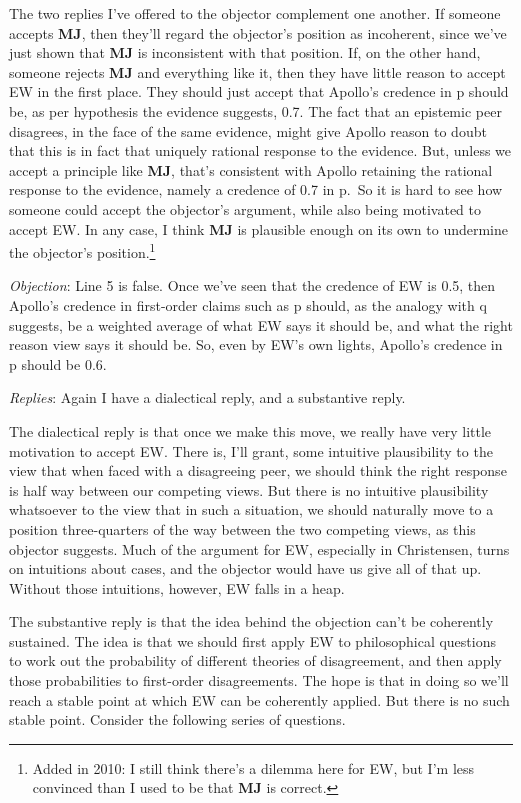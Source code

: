 \documentclass[
  11pt,
  letterpaper,
  DIV=11,
  numbers=noendperiod,
  twoside]{scrartcl}
\begin{document}
The two replies I've offered to the objector complement one another. If
someone accepts \textbf{MJ}, then they'll regard the objector's position
as incoherent, since we've just shown that \textbf{MJ} is inconsistent
with that position. If, on the other hand, someone rejects \textbf{MJ}
and everything like it, then they have little reason to accept EW in the
first place. They should just accept that Apollo's credence in p should
be, as per hypothesis the evidence suggests, 0.7. The fact that an
epistemic peer disagrees, in the face of the same evidence, might give
Apollo reason to doubt that this is in fact that uniquely rational
response to the evidence. But, unless we accept a principle like
\textbf{MJ}, that's consistent with Apollo retaining the rational
response to the evidence, namely a credence of 0.7 in p.~So it is hard
to see how someone could accept the objector's argument, while also
being motivated to accept EW. In any case, I think \textbf{MJ} is
plausible enough on its own to undermine the objector's
position.\footnote{Added in 2010: I still think there's a dilemma here
  for EW, but I'm less convinced than I used to be that \textbf{MJ} is
  correct.}

\emph{Objection}: Line 5 is false. Once we've seen that the credence of
EW is 0.5, then Apollo's credence in first-order claims such as p
should, as the analogy with q suggests, be a weighted average of what EW
says it should be, and what the right reason view says it should be. So,
even by EW's own lights, Apollo's credence in p should be 0.6.

\emph{Replies}: Again I have a dialectical reply, and a substantive
reply.

The dialectical reply is that once we make this move, we really have
very little motivation to accept EW. There is, I'll grant, some
intuitive plausibility to the view that when faced with a disagreeing
peer, we should think the right response is half way between our
competing views. But there is no intuitive plausibility whatsoever to
the view that in such a situation, we should naturally move to a
position three-quarters of the way between the two competing views, as
this objector suggests. Much of the argument for EW, especially in
Christensen, turns on intuitions about cases, and the objector would
have us give all of that up. Without those intuitions, however, EW falls
in a heap.

The substantive reply is that the idea behind the objection can't be
coherently sustained. The idea is that we should first apply EW to
philosophical questions to work out the probability of different
theories of disagreement, and then apply those probabilities to
first-order disagreements. The hope is that in doing so we'll reach a
stable point at which EW can be coherently applied. But there is no such
stable point. Consider the following series of questions.
\end{document}
